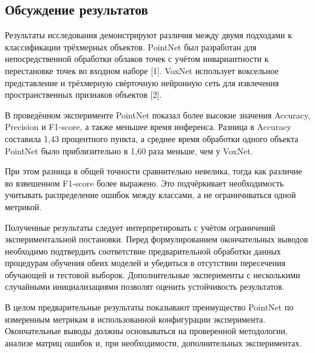 \documentclass{misisarticle}
\begin{document}
\subsection{Обсуждение результатов}
Результаты исследования демонстрируют различия между двумя подходами к классификации трёхмерных объектов. PointNet был разработан для непосредственной обработки облаков точек с учётом инвариантности к перестановке точек во входном наборе [1]. VoxNet использует воксельное представление и трёхмерную свёрточную нейронную сеть для извлечения пространственных признаков объектов [2].\par
В проведённом эксперименте PointNet показал более высокие значения Accuracy, Precision и F1-score, а также меньшее время инференса. Разница в Accuracy составила 1,43 процентного пункта, а среднее время обработки одного объекта PointNet было приблизительно в 1,60 раза меньше, чем у VoxNet.\par
При этом разница в общей точности сравнительно невелика, тогда как различие во взвешенном F1-score более выражено. Это подчёркивает необходимость учитывать распределение ошибок между классами, а не ограничиваться одной метрикой.\par
Полученные результаты следует интерпретировать с учётом ограничений экспериментальной постановки. Перед формулированием окончательных выводов необходимо подтвердить соответствие предварительной обработки данных процедурам обучения обеих моделей и убедиться в отсутствии пересечения обучающей и тестовой выборок. Дополнительные эксперименты с несколькими случайными инициализациями позволят оценить устойчивость результатов.\par
В целом предварительные результаты показывают преимущество PointNet по измеренным метрикам в использованной конфигурации эксперимента. Окончательные выводы должны основываться на проверенной методологии, анализе матриц ошибок и, при необходимости, дополнительных экспериментах.\par
\FloatBarrier
\end{document}
